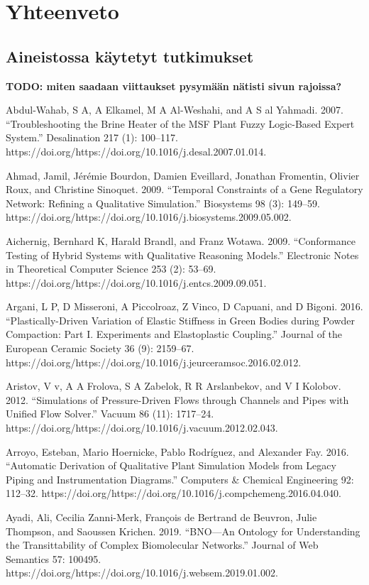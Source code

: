 \documentclass[utf8]{gradu3}
\begin{document}
\chapter{Yhteenveto}


\printbibliography

\appendix
\section{Aineistossa käytetyt tutkimukset}
\textbf{TODO: miten saadaan viittaukset pysymään nätisti sivun rajoissa?}

Abdul-Wahab, S A, A Elkamel, M A Al-Weshahi, and A S al Yahmadi. 2007. “Troubleshooting the Brine Heater of the MSF Plant Fuzzy Logic-Based Expert System.” Desalination 217 (1): 100–117. https://doi.org/https://doi.org/10.1016/j.desal.2007.01.014.

Ahmad, Jamil, Jérémie Bourdon, Damien Eveillard, Jonathan Fromentin, Olivier Roux, 
and Christine Sinoquet. 2009. 
“Temporal Constraints of a Gene Regulatory Network: 
Refining a Qualitative Simulation.” Biosystems 98 (3): 149–59.
https://doi.org/https://doi.org/10.1016/j.biosystems.2009.05.002.

Aichernig, Bernhard K, Harald Brandl, and Franz Wotawa. 2009. “Conformance Testing of Hybrid Systems with Qualitative Reasoning Models.” Electronic Notes in Theoretical Computer Science 253 (2): 53–69. https://doi.org/https://doi.org/10.1016/j.entcs.2009.09.051.

Argani, L P, D Misseroni, A Piccolroaz, Z Vinco, D Capuani, and D Bigoni. 2016. “Plastically-Driven Variation of Elastic Stiffness in Green Bodies during Powder Compaction: Part I. Experiments and Elastoplastic Coupling.” Journal of the European Ceramic Society 36 (9): 2159–67. https://doi.org/https://doi.org/10.1016/j.jeurceramsoc.2016.02.012.

Aristov, V v, A A Frolova, S A Zabelok, R R Arslanbekov, and V I Kolobov. 2012. “Simulations of Pressure-Driven Flows through Channels and Pipes with Unified Flow Solver.” Vacuum 86 (11): 1717–24. https://doi.org/https://doi.org/10.1016/j.vacuum.2012.02.043.

Arroyo, Esteban, Mario Hoernicke, Pablo Rodríguez, and Alexander Fay. 2016. “Automatic Derivation of Qualitative Plant Simulation Models from Legacy Piping and Instrumentation Diagrams.” Computers \& Chemical Engineering 92: 112–32. https://doi.org/https://doi.org/10.1016/j.compchemeng.2016.04.040.

Ayadi, Ali, Cecilia Zanni-Merk, François de Bertrand de Beuvron, Julie Thompson, and Saoussen Krichen. 2019. “BNO—An Ontology for Understanding the Transittability of Complex Biomolecular Networks.” Journal of Web Semantics 57: 100495. https://doi.org/https://doi.org/10.1016/j.websem.2019.01.002.
\end{document}
